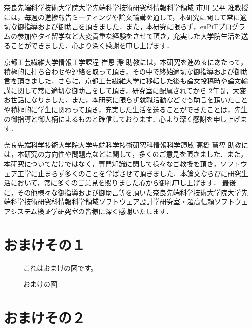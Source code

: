 \documentclass[12pt]{jarticle} %
\begin{document}
奈良先端科学技術大学院大学先端科学技術研究科情報科学領域 市川 昊平 准教授には，毎週の進捗報告ミーティングや論文輪講を通して，本研究に関して常に適切な御指導および御助言を頂きました．また，本研究に限らず，enPiTプログラムの参加やタイ留学など大変貴重な経験をさせて頂き，充実した大学院生活を送ることができました．心より深く感謝を申し上げます．

京都工芸繊維大学情報工学課程 崔恩 瀞 助教には，本研究を進めるにあたって，積極的に打ち合わせや連絡を取って頂き，その中で終始適切な御指導および御助言を頂きました．さらに，京都工芸繊維大学に移転した後も論文投稿時や論文輪講に関して常に適切な御助言をして頂き，研究室に配属されてから 2年間，大変お世話になりました．また，本研究に限らず就職活動などでも助言を頂いたことや積極的に学生に関わって頂き，充実した生活を送ることができたことは，先生の御指導と御人柄によるものと確信しております．心より深く感謝を申し上げます．

奈良先端科学技術大学院大学先端科学技術研究科情報科学領域 高橋 慧智 助教には，本研究の方向性や問題点などに関して，多くのご意見を頂きました．また，本研究についてだけではなく，専門知識に関して様々なご教授を頂き，ソフトウェア工学に止まらず多くのことを学ばさせて頂きました．本論文ならびに研究生活において，常に多くのご意見を賜りました心から御礼申し上げます．
最後に，その他様々な御指導および御助言等を頂いた奈良先端科学技術大学院大学先端科学技術研究科情報科学領域ソフトウェア設計学研究室・超高信頼ソフトウェアシステム検証学研究室の皆様に深く感謝いたします．


%
%
\newpage


%
%
\appendix

\section{おまけその１}
\label{omake1}



\begin{figure}
\centerline{これはおまけの図です。}
\caption{おまけの図}
\end{figure}


\section{おまけその２}
\end{document}
